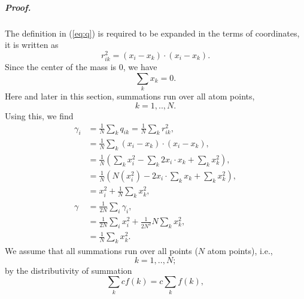 \documentclass[12pt]{article}
\begin{document}
\subparagraph{Proof.}
The definition in (\ref{eq:q}) is required to be expanded in the terms of coordinates, it is written as
\begin{equation*}
    r_{ik}^2=(x_i-x_k)\cdot(x_i-x_k).
    \label{eq:q_expand}
\end{equation*}
Since the center of the mass is $0$, we have
\begin{equation*}
    \sum_k x_k = 0.
    \label{eq:centerofmass}
\end{equation*}
Here and later in this section, summations run over all atom points,
\begin{equation*}
    k = 1,..,N.
    \label{eq:k_index}
\end{equation*}
Using this, we find
\begin{equation*}
    \begin{split}
        \gamma_i &= \frac{1}{N} \sum_k q_{ik} = \frac{1}{N} \sum_k r_{ik}^2, \\
        &= \frac{1}{N} \sum_k (x_i-x_k) \cdot (x_i-x_k), \\
        &= \frac{1}{N} \left( \sum_k x_i^2 - \sum_k 2 x_i\cdot x_k + \sum_k x_k^2 \right), \\
        &= \frac{1}{N} \left( N (x_i^2) - 2 x_i \cdot \sum_k x_k + \sum_k x_k^2 \right), \\
        &= x_i^2 + \frac{1}{N}\sum_k x_k^2, \\
        \gamma &= \frac{1}{2N}\sum_i \gamma_i, \\
        &= \frac{1}{2N}  \sum_i x_i^2 + \frac{1}{2N^2} N \sum_k x_k^2, \\
        &= \frac{1}{N} \sum_k x_k^2.
    \end{split}
    \label{eq:gamma_i_expand}
\end{equation*}
\iffalse
We assume that all summations run over all points ($N$ atom points), i.e.,
\begin{equation}
    k = 1,..,N;
\end{equation}
by the distributivity of summation
\begin{equation}
    \sum_k c f(k) = c \sum_k f(k),
    \label{eq:distsum}
\end{equation}
\end{document}

